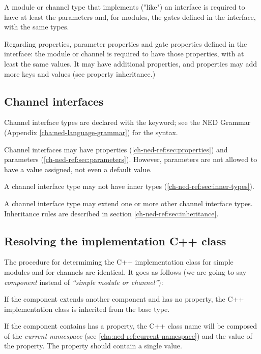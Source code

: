 A module or channel type that implements ("like") an interface is
required to have at least the parameters and, for modules, the gates
defined in the interface, with the same types.

Regarding properties, parameter properties and gate properties defined
in the interface: the module or channel is required to have those properties,
with at least the same values. It may have additional properties,
and properties may add more keys and values (see property inheritance.)



\subsection{Channel interfaces}
\label{ch-ned-ref:sec:channel-interfaces}

Channel interface types are declared with the  keyword;
see the NED Grammar (Appendix \ref{cha:ned-language-grammar}) for the
syntax.

Channel interfaces may have properties (\ref{ch-ned-ref:sec:properties}) and
parameters (\ref{ch-ned-ref:sec:parameters}). However, parameters are not
allowed to have a value assigned, not even a default value.

A channel interface type may not have inner types (\ref{ch-ned-ref:sec:inner-types}).

A channel interface type may extend one or more other channel interface types.
Inheritance rules are described in section \ref{ch-ned-ref:sec:inheritance}.



\subsection{Resolving the implementation C++ class}
\label{ch-ned-ref:sec:resolving-cpp-class}

The procedure for determiming the C++ implementation class for simple modules
and for channels are identical. It goes as follows (we are going to say
\textit{component} instead of \textit{``simple module or channel''}):

If the component extends another component and has no
 property, the C++ implementation class is inherited from the base
type.

If the component contains has a  property, the C++ class
name will be composed of the \textit{current namespace} (see
\ref{cha:ned-ref:current-namespace}) and the value of the 
property. The  property should contain a single value.

